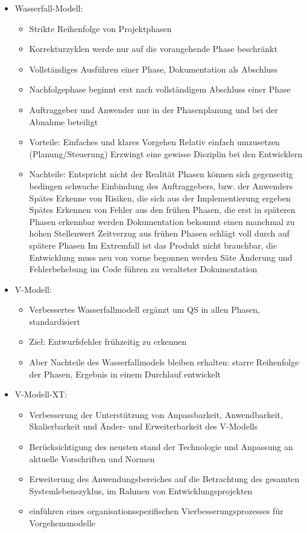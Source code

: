 \documentclass[10pt,a5paper]{article}
\begin{document}
\begin{itemize}
\begin{itemize}
\end{itemize}
\item Wasserfall-Modell:\begin{itemize}
\item Strikte Reihenfolge von Projektphasen
\item Korrekturzyklen werde nur auf die vorangehende Phase beschränkt
\item Vollständiges Ausführen einer Phase, Dokumentation als Abschluss
\item Nachfolgephase beginnt erst nach vollständigem Abschluss einer Phase
\item Auftraggeber und Anwender nur in der Phasenplanung und bei der Abnahme beteiligt
\item Vorteile:
\subitem Einfaches und klares Vorgehen
\subitem Relativ einfach umzusetzen (Planung/Steuerung)
\subitem Erzwingt eine gewisse Disziplin bei den Entwicklern
\item Nachteile:
\subitem Entspricht nicht der Realität
\subitem Phasen können sich gegenseitig bedingen
\subitem schwache Einbindung des Auftraggebers, bzw. der Anwenders
\subitem Spätes Erkenne von Risiken, die sich aus der Implementierung ergeben
\subitem Spätes Erkennen von Fehler aus den frühen Phasen, die erst in späteren Phasen erkennbar werden
\subitem Dokumentation bekommt einen manchmal zu hohen Stellenwert
\subitem Zeitverzug aus frühen Phasen schlägt voll durch auf spätere Phasen
\subitem Im Extremfall ist das Produkt nicht brauchbar, die Entwicklung muss neu von vorne begonnen werden
\subitem Säte Änderung und Fehlerbehebung im Code führen zu veralteter Dokumentation
\end{itemize}\newpage
\item V-Modell:\begin{itemize}
\item Verbessertes Wasserfallmodell
\subitem ergänzt um QS in allen Phasen, standardisiert
\item Ziel: Entwurfsfehler frühzeitig zu erkennen
\item Aber Nachteile des Wasserfallmodels bleiben erhalten:
\subitem starre Reihenfolge der Phasen, Ergebnis in einem Durchlauf entwickelt
\end{itemize}
\item V-Modell-XT:\begin{itemize}
\item Verbesserung der Unterstützung von Anpassbarkeit, Anwendbarkeit, Skalierbarkeit und Änder- und Erweiterbarkeit des V-Modells
\item Berücksichtigung des neusten stand der Technologie und Anpassung an aktuelle Vorschriften und Normen
\item Erweiterung des Anwendungsbereiches auf die Betrachtung des gesamten Systemlebenszyklus, im Rahmen von Entwicklungsprojekten
\item einführen eines organisationsspezifischen Vierbesserungsprozesses für Vorgehensmodelle
\end{itemize}
\end{itemize}
\end{document}
